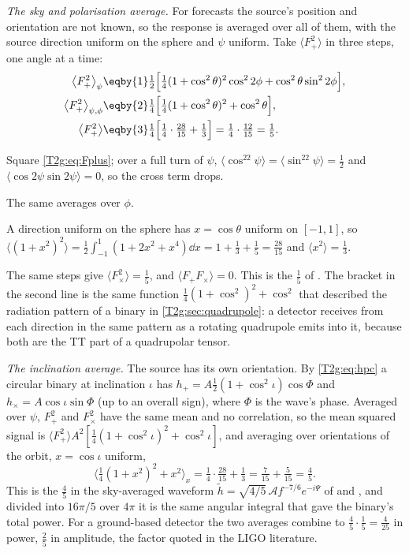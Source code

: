 \emph{The sky and polarisation average.} For forecasts the source's position and orientation are not known, so the response is averaged over all of them, with the source direction uniform on the sphere and $\psi$ uniform. Take $\langle F_+^2\rangle$ in three steps, one angle at a time:
\begin{align}
  \big\langle F_+^2\big\rangle_\psi
  &\eqby{1}\tfrac12\Big[\tfrac14(1+\cos^2\theta)^2\cos^22\phi+\cos^2\theta\sin^22\phi\Big],\nonumber\\
  \big\langle F_+^2\big\rangle_{\psi,\phi}
  &\eqby{2}\tfrac14\Big[\tfrac14(1+\cos^2\theta)^2+\cos^2\theta\Big],\nonumber\\
  \big\langle F_+^2\big\rangle
  &\eqby{3}\tfrac14\Big[\tfrac14\cdot\tfrac{28}{15}+\tfrac13\Big]=\tfrac14\cdot\tfrac{12}{15}=\tfrac15 .
  \label{T2g:eq:one-fifth}
\end{align}
\begin{explain}
  \item Square \eqref{T2g:eq:Fplus}; over a full turn of $\psi$, $\langle\cos^22\psi\rangle=\langle\sin^22\psi\rangle=\tfrac12$ and $\langle\cos2\psi\sin2\psi\rangle=0$, so the cross term drops.
  \item The same averages over $\phi$.
  \item A direction uniform on the sphere has $x=\cos\theta$ uniform on $[-1,1]$, so $\langle(1+x^2)^2\rangle=\tfrac12\int_{-1}^1(1+2x^2+x^4)\dd x=1+\tfrac13+\tfrac15=\tfrac{28}{15}$ and $\langle x^2\rangle=\tfrac13$.
\end{explain}
The same steps give $\langle F_\times^2\rangle=\tfrac15$, and $\langle F_+F_\times\rangle=0$. This is the $\tfrac15$ of \cite[eq.~(7)]{Robson2019}. The bracket in the second line is the same function $\tfrac14(1+\cos^2)^2+\cos^2$ that described the radiation pattern of a binary in \cref{T2g:sec:quadrupole}: a detector receives from each direction in the same pattern as a rotating quadrupole emits into it, because both are the TT part of a quadrupolar tensor.

\emph{The inclination average.} The source has its own orientation. By \eqref{T2g:eq:hpc} a circular binary at inclination $\iota$ has $h_+=A\tfrac12(1+\cos^2\iota)\cos\Phi$ and $h_\times=A\cos\iota\sin\Phi$ (up to an overall sign), where $\Phi$ is the wave's phase. Averaged over $\psi$, $F_+^2$ and $F_\times^2$ have the same mean and no correlation, so the mean squared signal is $\langle F_+^2\rangle A^2[\tfrac14(1+\cos^2\iota)^2+\cos^2\iota]$, and averaging over orientations of the orbit, $x=\cos\iota$ uniform,
\begin{equation}
  \Big\langle\tfrac14(1+x^2)^2+x^2\Big\rangle_x=\tfrac14\cdot\tfrac{28}{15}+\tfrac13=\tfrac{7}{15}+\tfrac{5}{15}=\tfrac45 .
  \label{T2g:eq:four-fifths}
\end{equation}
This is the $\tfrac45$ in the sky-averaged waveform $\tilde h=\sqrt{4/5}\,\mathcal Af^{-7/6}e^{-i\Psi}$ of \cite[eq.~(44)]{Kim2023} and \cite[eq.~(16)]{Robson2019}, and divided into $16\pi/5$ over $4\pi$ it is the same angular integral that gave the binary's total power. For a ground-based detector the two averages combine to $\tfrac45\cdot\tfrac15=\tfrac4{25}$ in power, $\tfrac25$ in amplitude, the factor quoted in the LIGO literature.

